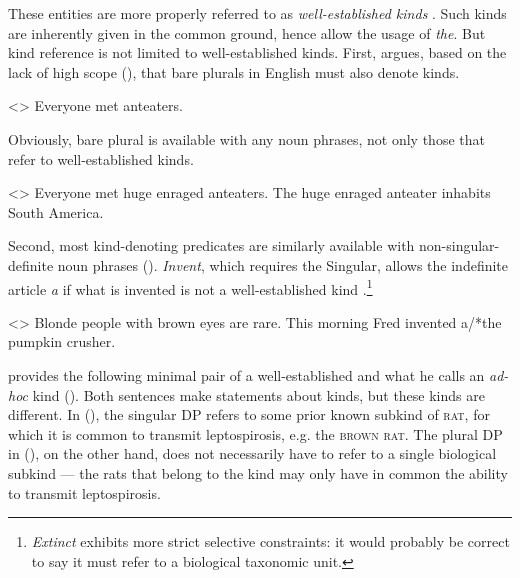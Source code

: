 \documentclass[a4paper, 12pt]{article}
\begin{document}

These entities are more properly referred to as \emph{well-established kinds} \parencite{krifka1995genericityintroduction}. Such kinds are inherently given in the common ground, hence allow the usage of \textit{the}. But kind reference is not limited to well-established kinds. First, \textcite{chierchia1998referencekindslanguages} argues, based on the lack of high scope (\nextx), that bare plurals in English must also denote kinds.

\ex<>
    Everyone met anteaters.
\xe

Obviously, bare plural is available with any noun phrases, not only those that refer to well-established kinds.

\pex<>
    \a Everyone met huge enraged anteaters.
    \a \ljudge*The huge enraged anteater inhabits South America.
\xe

Second, most kind-denoting predicates are similarly available with non-singular-definite noun phrases (\nextx). \textit{Invent}, which requires the Singular, allows the indefinite article \textit{a} if what is invented is not a well-established kind \parencite{dayal2004numbermarkingdefiniteness}.\footnote{\textit{Extinct} exhibits more strict selective constraints: it would probably be correct to say it must refer to a biological taxonomic unit.}

\pex<>
    \a Blonde people with brown eyes are rare.
    \a This morning Fred invented a/*the pumpkin crusher.
\xe

\textcite{mendia2019referenceadhoc} provides the following minimal pair of a well-established and what he calls an \emph{ad-hoc} kind (\nextx). Both sentences make statements about kinds, but these kinds are different. In (), the singular DP refers to some prior known subkind of \textsc{rat}, for which it is common to transmit leptospirosis, e.g. the \textsc{brown rat}. The plural DP in (), on the other hand, does not necessarily have to refer to a single biological subkind --- the rats that belong to the kind may only have in common the ability to transmit leptospirosis.
\end{document}
